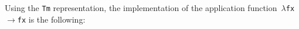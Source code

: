 \documentclass[9pt,preprint,authoryear]{sigplanconf}
\begin{document}
%
Using the \textcolor[rgb]{0,0,0.80}{\texttt{Tm}} representation, the implementation of the application
    function{~}\textcolor[cmyk]{0,0.65,0.99,0}{\texttt{$ \lambda $}}\textcolor[rgb]{0,0,0.80}{\texttt{\mbox{\hspace{0.50em}}}}\textcolor[rgb]{0,0,0.80}{\texttt{f}}\textcolor[rgb]{0,0,0.80}{\texttt{\mbox{\hspace{0.50em}}}}\textcolor[rgb]{0,0,0.80}{\texttt{x}}\textcolor[rgb]{0,0,0.80}{\texttt{\mbox{\hspace{0.50em}}}}\textcolor[cmyk]{0,0.65,0.99,0}{\texttt{$ \rightarrow $}}\textcolor[rgb]{0,0,0.80}{\texttt{\mbox{\hspace{0.50em}}}}\textcolor[rgb]{0,0,0.80}{\texttt{f}}\textcolor[rgb]{0,0,0.80}{\texttt{\mbox{\hspace{0.50em}}}}\textcolor[rgb]{0,0,0.80}{\texttt{x}} is the following{:}%


{\nopagebreak }
\end{document}
